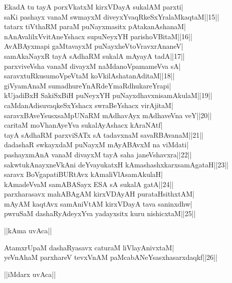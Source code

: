 \documentclass{article}
\begin{document}
EkadA tu tayA porxVkatxM kirxVDayA sukalAM parxti|\\
saKi pashayx vanaM swmayxM diveyxYvaqRkeSxYralaMkaqtaM||15||\\
tatarx tiVthaRM paraM puNayxmasitx pAtakanAshanaM|\\
nAnAvalilxVvitAneYshacx supuNeyxYH parishoVBitaM||16||\\
AvABAyxmapi gaMtavayxM puNayxheVtoVravxrAnaneV|\\
samAkaNayxR tayA sAdhaRM sukalA mAyayA tadA||17||\\
parxviveVsha vanaM divayxM naMdanoVpamameVva sA|\\
saravxtuRkusumoVpeVtaM koVkilAshatanAditaM||18||\\
giVyamAnaM sumadhureYnARdeYmaRdhukareYrapi|\\
kUjadiBxH SakiSxBiH puNeyxYH puNayxdhavxnisamAkulaM||19||\\
caMdanAdisuvaqkeSxYshacx swraBeYshacx virAjitaM|\\
saravxBAveYsusxsaMpUNaRM mAdhavAyx mAdhaveVna veY||20||\\
caritaM moVhanAyeYva sukalAyAshacx kAraNAtf|\\
tayA sAdhaRM parxviSATx sA tadavxnaM savaRBAvanaM||21||\\
dadashaR swkayxdaM puNayxM mAyABAvxM na viMdati|\\
pashayxmAnA vanaM divayxM tayA saha janeVshavxra||22||\\
sakwtukAnayxneVkAni deYvayukatxH kAmashashxkarxsamAgataH||23||\\
saravx BoVgapatiBURtAvx kAmaliVlAsamAkulaH|\\
kAmadeVvaM samABASayx ESA sA sukalA gatA||24||\\
parxharasavx mahABAgAM kirxVDAyAH purataHsithxtAM|\\
mAyAM kaqtAvx samAniVtAM kirxVDayA tava saninxdhw|\\
pwruSaM dashaRyAdeyxYva yadayxsitx kuru nishicxtaM||25||\\

\begin{center}
||kAma uvAca||
\end{center}

AtamxrUpaM dashaRyasavx caturaM liVlayAnivxtaM|\\
yeVnAhaM parxhareV tevxVnAM paMcabANeYsasxhasarxdaqkf||26||\\

\begin{center}
||iMdarx uvAca||
\end{center}
\end{document}
